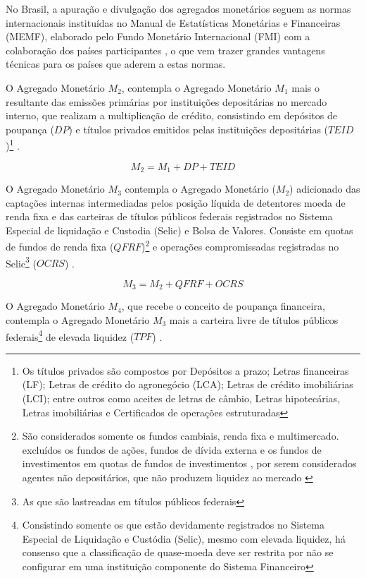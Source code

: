 \documentclass[
  12pt,
  12pt,
  openright,
  oneside,
  a4paper,
  chapter=TITLE,
  section=TITLE,
  subsection=TITLE,
  subsubsection=TITLE,
  portugues,
  sumario=tradicional]{abntex2}
\begin{document}
No Brasil, a apuração e divulgação dos agregados monetários seguem as normas internacionais instituídas no Manual de Estatísticas Monetárias e Financeiras (MEMF), elaborado pelo Fundo Monetário Internacional (FMI) com a colaboração dos países participantes \cite{sgs:mpa}, o que vem trazer grandes vantagens técnicas para os países que aderem a estas normas.

O Agregado Monetário \(M_2\), contempla o Agregado Monetário \(M_1\) mais o resultante das emissões primárias por instituições depositárias no mercado interno, que realizam a multiplicação de crédito, consistindo em depósitos de poupança (\(DP\)) e títulos privados emitidos pelas instituições depositárias (\(TEID\))\footnote{Os títulos privados são compostos por Depósitos a prazo; Letras financeiras (LF); Letras de crédito do agronegócio (LCA); Letras de crédito imobiliárias (LCI); entre outros como aceites de letras de câmbio, Letras hipotecárias, Letras imobiliárias e Certificados de operações estruturadas} \cite{sgs:mpa}.

\begin{equation}
M_2 = M_1 + DP + TEID
\end{equation}

O Agregado Monetário \(M_3\) contempla o Agregado Monetário (\(M_2\)) adicionado das captações internas intermediadas pelos posição líquida de detentores moeda de renda fixa e das carteiras de títulos públicos federais registrados no Sistema Especial de liquidação e Custodia (Selic) e Bolsa de Valores. Consiste em quotas de fundos de renda fixa (\(QFRF\))\footnote{São considerados somente os fundos cambiais, renda fixa  e multimercado. excluídos os fundos de ações, fundos de dívida externa e os fundos de investimentos em quotas de fundos de investimentos , por serem considerados agentes não depositários, que não produzem liquidez ao mercado \cite{sgs:mpa}} e operações compromissadas registradas no Selic\footnote{As que são lastreadas em títulos públicos federais} (\(OCRS\)) \cite{bcb:2019} \cite{sgs:mpa}.

\begin{equation}
M_3 = M_2 + QFRF + OCRS
\end{equation}

O Agregado Monetário \(M_4\), que recebe o conceito de poupança financeira, contempla o Agregado Monetário \(M_3\) mais a carteira livre de títulos públicos federais\footnote{Consistindo somente os que estão devidamente registrados no Sistema Especial de Liquidação e Custódia (Selic), mesmo com elevada liquidez, há consenso que a classificação de quase-moeda deve ser restrita por não se configurar em uma instituição componente do Sistema Financeiro} de elevada liquidez (\(TPF\)) \cite{bcb:2019}.
\end{document}
